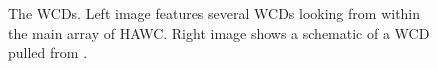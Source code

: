 \begin{figure}
    \caption{The WCDs. Left image features several WCDs looking from within the main array of HAWC. Right image shows a schematic of a WCD pulled from \cite{HAWC_NIM}.}
    \label{fig:WCD_schematic}
\end{figure}

